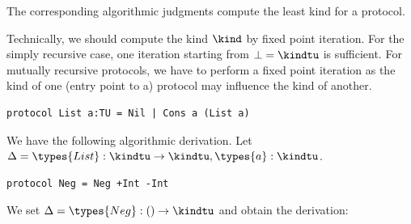 The corresponding algorithmic judgments compute the least kind for a protocol.
\begin{mathpar}

\end{mathpar}
Technically, we should compute the kind $\kind$  by fixed point
iteration. For the simply recursive case, one iteration starting from
$\bot = \kindtu$ is sufficient. For mutually recursive protocols, we
have to perform a fixed point iteration as the kind of one (entry
point to a) protocol
may influence the kind of another.

\begin{example}
\begin{lstlisting}
protocol List a:TU = Nil | Cons a (List a)
\end{lstlisting}
  We have the following algorithmic derivation. Let $\Delta =
  \types{List} : \kindtu \to \kindtu, \types{a} : \kindtu$.
  \begin{mathpar}
  \end{mathpar}

\begin{lstlisting}
protocol Neg = Neg +Int -Int
\end{lstlisting}
  We set $ \Delta = \types{Neg} : () \to \kindtu$ and obtain the derivation:
  \begin{mathpar}
  \end{mathpar}
\end{example}


